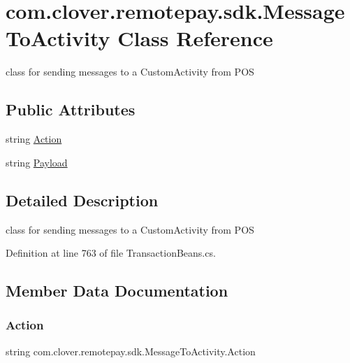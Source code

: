 \hypertarget{classcom_1_1clover_1_1remotepay_1_1sdk_1_1_message_to_activity}{}\section{com.\+clover.\+remotepay.\+sdk.\+Message\+To\+Activity Class Reference}
\label{classcom_1_1clover_1_1remotepay_1_1sdk_1_1_message_to_activity}


class for sending messages to a Custom\+Activity from P\+OS  


\subsection*{Public Attributes}
\begin{DoxyCompactItemize}
\item 
string \hyperlink{classcom_1_1clover_1_1remotepay_1_1sdk_1_1_message_to_activity_a7d5f7f85ec8ff64cbeb75d041d6d6a09}{Action}
\item 
string \hyperlink{classcom_1_1clover_1_1remotepay_1_1sdk_1_1_message_to_activity_adb7eb4d199d215741e2184b04ec5e08e}{Payload}
\end{DoxyCompactItemize}


\subsection{Detailed Description}
class for sending messages to a Custom\+Activity from P\+OS 



Definition at line 763 of file Transaction\+Beans.\+cs.



\subsection{Member Data Documentation}
\mbox{\label{classcom_1_1clover_1_1remotepay_1_1sdk_1_1_message_to_activity_a7d5f7f85ec8ff64cbeb75d041d6d6a09}} 
\subsubsection{\texorpdfstring{Action}{Action}}
{\footnotesize\ttfamily string com.\+clover.\+remotepay.\+sdk.\+Message\+To\+Activity.\+Action}



